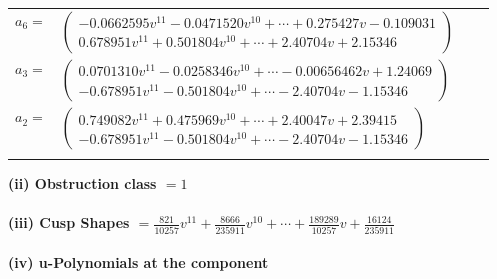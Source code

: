 \documentclass[1p]{elsarticle_modified}
\theoremstyle{definition}
\begin{document}
\begin{tabular}{m{7pt} m{180pt} m{7pt} m{180pt} }
\flushright $a_{6}=$&$\begin{pmatrix}-0.0662595 v^{11}-0.0471520 v^{10}+\cdots+0.275427 v-0.109031\\0.678951 v^{11}+0.501804 v^{10}+\cdots+2.40704 v+2.15346\end{pmatrix}$ \\
\flushright $a_{3}=$&$\begin{pmatrix}0.0701310 v^{11}-0.0258346 v^{10}+\cdots-0.00656462 v+1.24069\\-0.678951 v^{11}-0.501804 v^{10}+\cdots-2.40704 v-1.15346\end{pmatrix}$ \\
\flushright $a_{2}=$&$\begin{pmatrix}0.749082 v^{11}+0.475969 v^{10}+\cdots+2.40047 v+2.39415\\-0.678951 v^{11}-0.501804 v^{10}+\cdots-2.40704 v-1.15346\end{pmatrix}$\\&\end{tabular}
\flushleft \textbf{(ii) Obstruction class $= 1$}\\~\\
\flushleft \textbf{(iii) Cusp Shapes $= \frac{821}{10257} v^{11}+\frac{8666}{235911} v^{10}+\cdots+\frac{189289}{10257} v+\frac{16124}{235911}$}\\~\\
\newpage\renewcommand{\arraystretch}{1}
\flushleft \textbf{(iv) u-Polynomials at the component}\newline \\
\end{document}

